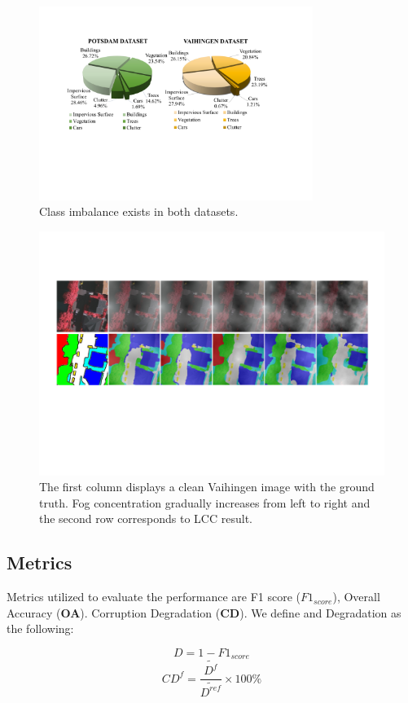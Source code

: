 \documentclass[lettersize,journal]{IEEEtran}
\begin{document}
\begin{figure}[!htbp]
    \centering
    \includegraphics[width=3.5in]{dataset.pdf}
    \caption{Class imbalance exists in both datasets.}
    \label{imbalance}
    \vspace{-0.2cm}
\end{figure}

\begin{figure}[!htbp]
    \centering
    \includegraphics[width=\columnwidth]{fogSeverity}
    \caption{The first column displays a clean Vaihingen image with the ground truth. Fog concentration gradually increases from left to right and the second row corresponds to LCC result.}
    \label{fogSeverity}
    \vspace{-0.5cm}
\end{figure}
\subsection{Metrics}
Metrics utilized to evaluate the performance are F1 score (\textbf{$F1_{score}$}), Overall Accuracy (\textbf{OA}). Corruption Degradation (\textbf{CD}). We define \cite{kamannBenchmarkingRobustnessSemantic2021}  and Degradation  as the following:
\begin{small}
    \begin{equation}
        D=1- F1_{score}
        \label{Degradation}
    \end{equation}
    \begin{equation}
        CD^{f}=\frac{\widetilde{D^{f}}}{\widetilde{{D}^{r e f}}}\times 100\%
        \label{CD}
    \end{equation}
\end{small}
\end{document}
